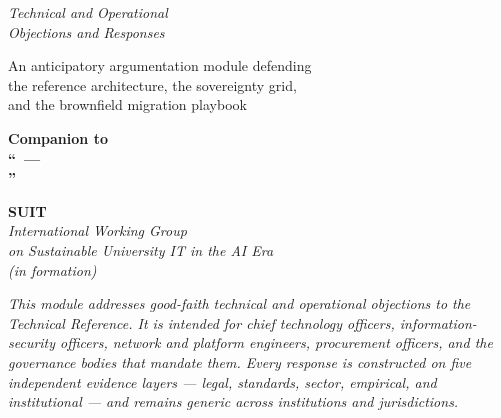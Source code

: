 \documentclass[11pt,a4paper,twoside]{book}
\begin{document}
\hypersetup{pageanchor=false}
\begin{titlepage}
\centering
\vspace*{0.5cm}

{\suittitlelogo}

\vspace{0.8cm}

{\Huge\bfseries \suitsolutiontitle}

\vspace{0.5cm}
{\LARGE\itshape Technical and Operational\\Objections and Responses}

\vspace{1.2cm}
{\large An anticipatory argumentation module defending\\
the reference architecture, the sovereignty grid,\\
and the brownfield migration playbook}

\vspace{2cm}

\begin{tcolorbox}[
    colback=NavyBlue!8!white,
    colframe=NavyBlue!85!black,
    boxrule=1.2pt,
    arc=3pt,
    left=12pt, right=12pt, top=8pt, bottom=8pt,
    width=0.88\textwidth,
    halign=center
]
{\large\bfseries Companion to\\
``\suitsolutiontitle\ --- \suitsolutionsubtitlemain\\
\suitsolutionsubtitlerest''}
\end{tcolorbox}

\vspace{1cm}
\suitmetablock

\vspace{0.9cm}

\begin{minipage}{0.85\textwidth}
\centering
{\large\bfseries SUIT}\\[3pt]
{\normalsize\itshape International Working Group\\on Sustainable University IT in the AI Era}\\[4pt]
{\small\itshape (in formation)}
\end{minipage}

\vspace{0.9cm}

\begin{minipage}{0.85\textwidth}
\centering\small\itshape
This module addresses good-faith technical and operational objections
to the Technical Reference. It is intended for chief technology officers,
information-security officers, network and platform engineers, procurement
officers, and the governance bodies that mandate them. Every response is
constructed on five independent evidence layers --- legal, standards,
sector, empirical, and institutional --- and remains generic across
institutions and jurisdictions.
\end{minipage}


\end{titlepage}
\end{document}
